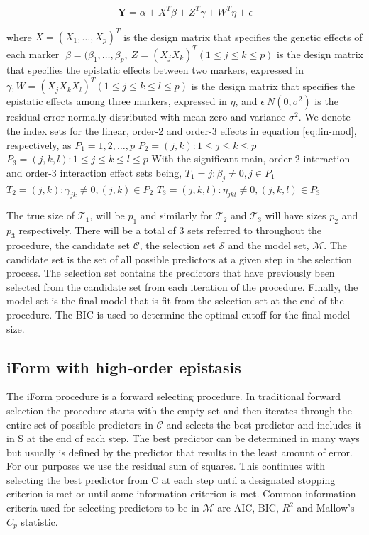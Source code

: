 \documentclass[11pt,]{book}
\theoremstyle{definition}
\theoremstyle{definition}
\theoremstyle{remark}
\begin{document}
\begin{equation}
\mathbf{Y}=\alpha + X^T\beta + Z^T\gamma + W^T\eta + \epsilon
\label{eq:lin-mod}
\end{equation}

where \(X=(X_1,\dots,X_p)^T\) is the design matrix that specifies the
genetic effects of each marker
\(\beta=(\beta_1,\dots,\beta_p,~ Z=(X_jX_k)^T (1 \le j \le k \le p)\)
is the design matrix that specifies the epistatic effects between two
markers, expressed in
\(\gamma, W=(X_j X_k X_l)^T (1 \le j \le k \le l \le p)\) is the design
matrix that specifies the epistatic effects among three markers,
expressed in \(\eta\), and \(\epsilon ~ N(0,\sigma^2 )\) is the residual
error normally distributed with mean zero and variance \(\sigma^2\). We
denote the index sets for the linear, order-2 and order-3 effects in
equation \eqref{eq:lin-mod}, respectively, as \(P_1={1,2,\dots,p}\)
\(P_2={(j,k):1 \le j \le k \le p}\)
\(P_3={(j,k,l):1 \le j \le k \le l \le p}\) With the significant main,
order-2 interaction and order-3 interaction effect sets being,
\(T_1={j:\beta_j \ne 0,j \in P_1}\)
\(T_2={(j,k):\gamma_{jk} \ne 0,(j,k) \in P_2}\)
\(T_3={(j,k,l):\eta_{jkl} \ne 0,(j,k,l) \in P_3}\)

The true size of \(\mathcal{T}_1\), will be \(p_1\) and similarly for
\(\mathcal{T}_2\) and \(\mathcal{T}_3\) will have sizes \(p_2\) and
\(p_3\) respectively. There will be a total of 3 sets referred to
throughout the procedure, the candidate set \(\mathcal{C}\), the
selection set \(\mathcal{S}\) and the model set, \(\mathcal{M}\). The
candidate set is the set of all possible predictors at a given step in
the selection process. The selection set contains the predictors that
have previously been selected from the candidate set from each iteration
of the procedure. Finally, the model set is the final model that is fit
from the selection set at the end of the procedure. The BIC is used to
determine the optimal cutoff for the final model size.

\subsection{iForm with high-order
epistasis}\label{iform-with-high-order-epistasis}

The iForm procedure is a forward selecting procedure. In traditional
forward selection the procedure starts with the empty set and then
iterates through the entire set of possible predictors in
\(\mathcal{C}\) and selects the best predictor and includes it in S at
the end of each step. The best predictor can be determined in many ways
but usually is defined by the predictor that results in the least amount
of error. For our purposes we use the residual sum of squares. This
continues with selecting the best predictor from C at each step until a
designated stopping criterion is met or until some information criterion
is met. Common information criteria used for selecting predictors to be
in \(\mathcal{M}\) are AIC, BIC, \(R^2\) and Mallow's \(C_p\) statistic.
\end{document}
